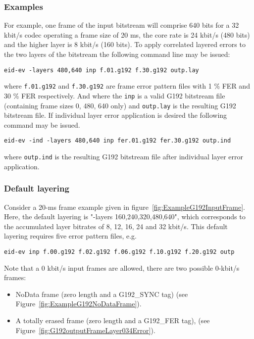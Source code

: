 \subsubsection{Examples }
For example, one frame of the input bitstream will comprise 640 bits
for a 32 kbit/s codec operating a frame size of 20 ms, the core rate
is 24 kbit/s (480 bits) and the higher layer is 8 kbit/s (160 bits).
To apply correlated layered errors to the two layers of the bitstream
the following command line may be issued:
\begin{center}
\texttt{eid-ev -layers 480,640 inp f.01.g192 f.30.g192 outp.lay}
\end{center}
where \texttt{f.01.g192} and \texttt{f.30.g192} are frame error pattern 
files with 1 \% FER and 30 \% FER respectively. And where the \texttt{inp} is a 
valid G192 bitstream file (containing frame sizes 0, 480, 640 only) 
and \texttt{outp.lay} is the resulting G192 bitstream file. If individual 
layer error application is desired the following command may be issued.
\begin{center}
\texttt{eid-ev -ind -layers 480,640 inp fer.01.g192 fer.30.g192 outp.ind}
\end{center}
where \texttt{outp.ind} is the resulting G192 bitstream file after individual layer error application.

\subsubsection{Default layering }
Consider a 20-ms frame example given in
figure~\ref{fig:ExampleG192InputFrame}. Here, the default layering is
"-layers 160,240,320,480,640", which corresponds to the accumulated
layer bitrates of 8, 12, 16, 24 and 32 kbit/s. This default layering
requires five error pattern files, e.g.
\begin{center}
\texttt{eid-ev inp f.00.g192 f.02.g192 f.06.g192 f.10.g192 f.20.g192 outp}
\end{center}

Note that a 0 kbit/s input frames are allowed, there are two possible
0-kbit/s frames:
\begin{itemize}
\item NoData frame (zero length and a G192\_SYNC tag) (see
  Figure~\ref{fig:ExampleG192NoDataFrame}).
\item A totally erased frame (zero length and a G192\_FER tag), (see
  Figure~\ref{fig:G192outputFrameLayer034Error}).
\end{itemize}

